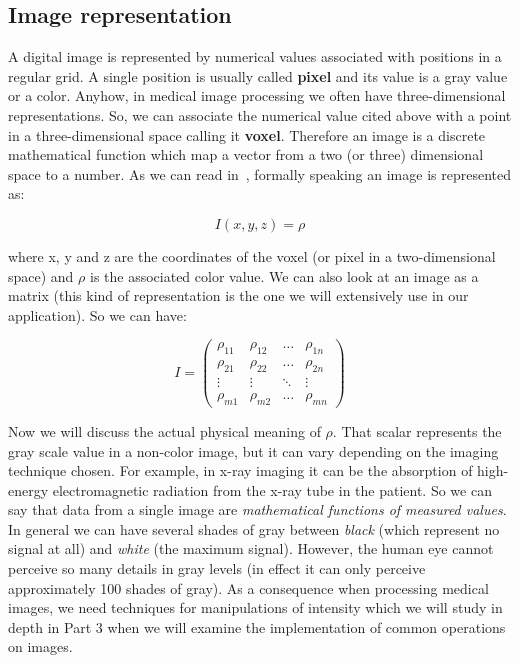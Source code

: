 \subsection{Image representation}

A digital image is represented by numerical values associated with positions in a regular grid. A single position is usually called \textbf{pixel} and its value is a gray value or a color. Anyhow, in medical image processing we often have three-dimensional representations. So, we can associate the numerical value cited above with a point in a three-dimensional space calling it \textbf{voxel}. Therefore an image is a discrete mathematical function which map a vector from a two (or three) dimensional space to a number. As we can read in~\cite{Birkfellner}, formally speaking an image is represented as:

\begin{equation}
 I(x, y, z) = \rho
\end{equation}

where x, y and z are the coordinates of the voxel (or pixel in a two-dimensional space) and $\rho$ is the associated color value.
We can also look at an image as a matrix (this kind of representation is the one we will extensively use in our application). So we can have:

\begin{equation}
I =
\begin{pmatrix}
\rho_{11} & \rho_{12} & \ldots & \rho_{1n} \\
\rho_{21} & \rho_{22} & \ldots & \rho_{2n} \\
\vdots & \vdots & \ddots & \vdots \\
\rho_{m1} & \rho_{m2} & \ldots & \rho_{mn}
\end{pmatrix}
\end{equation}

Now we will discuss the actual physical meaning of $\rho$. That scalar represents the gray scale value in a non-color image, but it can vary depending on the imaging technique chosen. For example, in x-ray imaging it can be the absorption of high-energy electromagnetic radiation from the x-ray tube in the patient. So we can say that data from a single image are \textit{mathematical functions of measured values}.
In general we can have several shades of gray between \textit{black} (which represent no signal at all) and \textit{white} (the maximum signal). However, the human eye cannot perceive so many details in gray levels (in effect it can only perceive approximately 100 shades of gray). As a consequence when processing medical images, we need techniques for manipulations of intensity which we will study in depth in Part 3 when we will examine the implementation of common operations on images.

